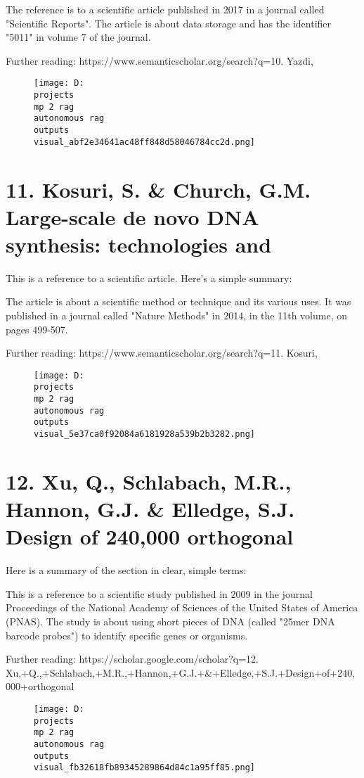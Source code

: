 \documentclass[12pt,a4paper]{article}
\begin{document}
The reference is to a scientific article published in 2017 in a journal called "Scientific Reports". The article is about data storage and has the identifier "5011" in volume 7 of the journal.

Further reading: https://www.semanticscholar.org/search?q=10.	Yazdi,%
\begin{figure}[h]
\centering
\texttt{[image: D:\\projects\\mp 2 rag\\autonomous rag\\outputs\\visual\_abf2e34641ac48ff848d58046784cc2d.png]}
\end{figure}
\section{11.	Kosuri, S. & Church, G.M. Large-scale de novo DNA synthesis: technologies and}
This is a reference to a scientific article. Here's a simple summary:

The article is about a scientific method or technique and its various uses. It was published in a journal called "Nature Methods" in 2014, in the 11th volume, on pages 499-507.

Further reading: https://www.semanticscholar.org/search?q=11.	Kosuri,%
\begin{figure}[h]
\centering
\texttt{[image: D:\\projects\\mp 2 rag\\autonomous rag\\outputs\\visual\_5e37ca0f92084a6181928a539b2b3282.png]}
\end{figure}
\section{12.	Xu, Q., Schlabach, M.R., Hannon, G.J. & Elledge, S.J. Design of 240,000 orthogonal}
Here is a summary of the section in clear, simple terms:

This is a reference to a scientific study published in 2009 in the journal Proceedings of the National Academy of Sciences of the United States of America (PNAS). The study is about using short pieces of DNA (called "25mer DNA barcode probes") to identify specific genes or organisms.

Further reading: https://scholar.google.com/scholar?q=12.	Xu,+Q.,+Schlabach,+M.R.,+Hannon,+G.J.+&+Elledge,+S.J.+Design+of+240,000+orthogonal
\begin{figure}[h]
\centering
\texttt{[image: D:\\projects\\mp 2 rag\\autonomous rag\\outputs\\visual\_fb32618fb89345289864d84c1a95ff85.png]}
\end{figure}
\end{document}
